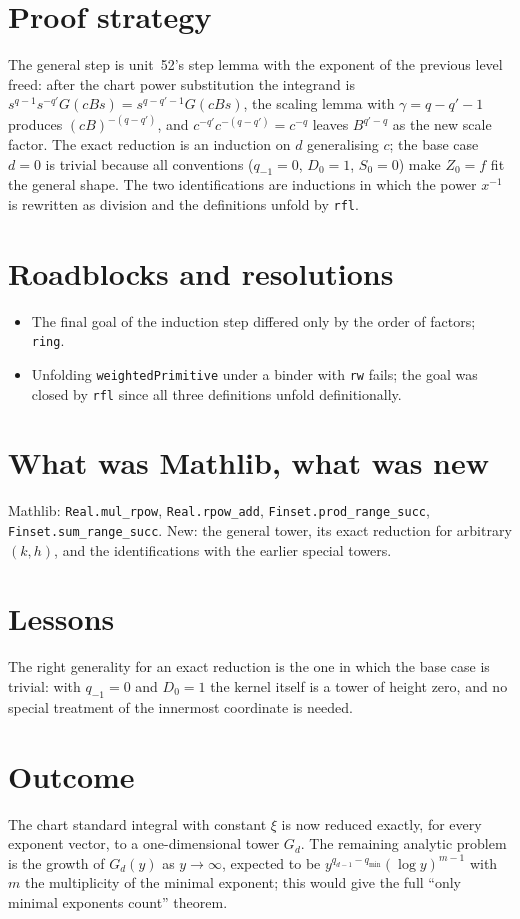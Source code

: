 \documentclass[11pt]{article}
\begin{document}
\section{Proof strategy}
The general step is unit~52's step lemma with the exponent of the previous level freed: after the
chart power substitution the integrand is $s^{q-1}s^{-q'}G(cBs)=s^{q-q'-1}G(cBs)$, the scaling lemma
with $\gamma=q-q'-1$ produces $(cB)^{-(q-q')}$, and $c^{-q'}c^{-(q-q')}=c^{-q}$ leaves $B^{q'-q}$ as
the new scale factor. The exact reduction is an induction on $d$ generalising $c$; the base case
$d=0$ is trivial because all conventions ($q_{-1}=0$, $D_0=1$, $S_0=0$) make $Z_0=f$ fit the general
shape. The two identifications are inductions in which the power $x^{-1}$ is rewritten as division
and the definitions unfold by \texttt{rfl}.

\section{Roadblocks and resolutions}
\begin{itemize}
\item The final goal of the induction step differed only by the order of factors; \texttt{ring}.
\item Unfolding \texttt{weightedPrimitive} under a binder with \texttt{rw} fails; the goal was
closed by \texttt{rfl} since all three definitions unfold definitionally.
\end{itemize}

\section{What was Mathlib, what was new}
Mathlib: \texttt{Real.mul\_rpow}, \texttt{Real.rpow\_add}, \texttt{Finset.prod\_range\_succ},
\texttt{Finset.sum\_range\_succ}. New: the general tower, its exact reduction for arbitrary
$(k,h)$, and the identifications with the earlier special towers.

\section{Lessons}
The right generality for an exact reduction is the one in which the base case is trivial: with
$q_{-1}=0$ and $D_0=1$ the kernel itself is a tower of height zero, and no special treatment of the
innermost coordinate is needed.

\section{Outcome}
The chart standard integral with constant $\xi$ is now reduced exactly, for every exponent vector, to
a one-dimensional tower $G_d$. The remaining analytic problem is the growth of $G_d(y)$ as
$y\to\infty$, expected to be $y^{q_{d-1}-q_{\min}}(\log y)^{m-1}$ with $m$ the multiplicity of the
minimal exponent; this would give the full ``only minimal exponents count'' theorem.
\end{document}

